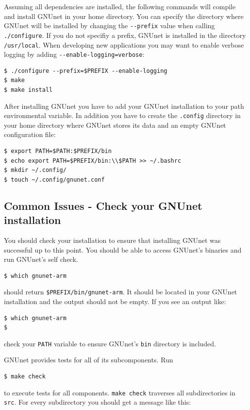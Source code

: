 \documentclass[10pt]{article}
\begin{document}
\label{sub:install}
Assuming all dependencies are installed, the following commands will
compile and install GNUnet in your home directory. You can specify the
directory where GNUnet will be installed by changing the
\lstinline|--prefix| value when calling \lstinline|./configure|.  If
you do not specifiy a prefix, GNUnet is installed in the directory
\lstinline|/usr/local|. When developing new applications you may want
to enable verbose logging by adding
\lstinline|--enable-logging=verbose|:

\lstset{language=bash}
\begin{lstlisting}
$ ./configure --prefix=$PREFIX --enable-logging
$ make
$ make install
\end{lstlisting}

After installing GNUnet you have to add your GNUnet installation to your path
environmental variable. In addition you have to create the \lstinline|.config|
directory in your home directory where GNUnet stores its data and an empty
GNUnet configuration file:

\lstset{language=bash}
\begin{lstlisting}
$ export PATH=$PATH:$PREFIX/bin
$ echo export PATH=$PREFIX/bin:\\$PATH >> ~/.bashrc
$ mkdir ~/.config/
$ touch ~/.config/gnunet.conf
\end{lstlisting}

\subsection{Common Issues - Check your GNUnet installation}

You should check your installation to ensure that installing GNUnet
was successful up to this point. You should be able to access GNUnet's
binaries and run GNUnet's self check.
\lstset{language=bash}
\begin{lstlisting}
$ which gnunet-arm
\end{lstlisting}
should return \lstinline|$PREFIX/bin/gnunet-arm|. It should be
located in your GNUnet installation and the output should not be
empty. If you see an output like:
\lstset{language=bash}
\begin{lstlisting}
$ which gnunet-arm
$
\end{lstlisting}
check your {\tt PATH} variable to ensure GNUnet's {\tt bin} directory is included.

GNUnet provides tests for all of its subcomponents. Run
\lstset{language=bash}
\begin{lstlisting}
$ make check
\end{lstlisting}
to execute tests for all components. {\tt make check} traverses all subdirectories in {\tt src}.
For every subdirectory you should get a message like this:
\end{document}
